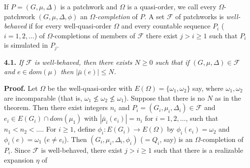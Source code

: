 If $P = (G, \mu, \Delta)$ is a patchwork and $\Omega$ is a quasi-order, we call every $\Omega$-patchwork $(G, \mu, \Delta, \phi)$ an $\Omega$\textit{-completion} of $P$. A set $\mathcal{F}$ of patchworks is \textit{well-behaved} if for every well-quasi-order $\Omega$ and every countable sequence $P_i$ ($i = 1, 2, \dots$) of $\Omega$-completions of members of $\mathcal{F}$ there exist $j > i \ge 1$ such that $P_i$ is simulated in $P_j$.

\textbf{4.1.} \textit{If $\mathcal{F}$ is well-behaved, then there exists $N \ge 0$ such that if $(G, \mu, \Delta) \in \mathcal{F}$ and $e \in dom(\mu)$ then $|\bar{\mu}(e)| \le N$.}

\textbf{Proof.} Let $\Omega$ be the well-quasi-order with $E(\Omega) = \{\omega_1, \omega_2\}$ say, where $\omega_1, \omega_2$ are incomparable (that is, $\omega_1 \not\le \omega_2 \not\le \omega_1$). Suppose that there is no $N$ as in the theorem. Then there exist integers $n_i$ and $P_i = (G_i, \mu_i, \Delta_i) \in \mathcal{F}$ and $e_i \in E(G_i) \cap dom(\mu_1)$ with $|\bar{\mu}_i(e_i)| = n_i$ for $i = 1, 2, \dots$, such that $n_1 < n_2 < \dots$. For $i \ge 1$, define $\phi_i : E(G_i) \to E(\Omega)$ by $\phi_i(e_i) = \omega_2$ and $\phi_i(e) = \omega_1$ ($e \ne e_i$). Then $(G_i, \mu_i, \Delta_i, \phi_i)$ ($= Q_i$, say) is an $\Omega$-completion of $P_i$. Since $\mathcal{F}$ is well-behaved, there exist $j > i \ge 1$ such that there is a realizable expansion $\eta$ of
